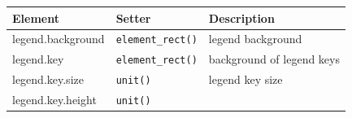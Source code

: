 \begin{longtable}[c]{@{}lll@{}}
\toprule
\begin{minipage}[b]{0.27\columnwidth}\raggedright\strut
Element
\strut\end{minipage} &
\begin{minipage}[b]{0.35\columnwidth}\raggedright\strut
Setter
\strut\end{minipage} &
\begin{minipage}[b]{0.58\columnwidth}\raggedright\strut
Description
\strut\end{minipage}\tabularnewline
\midrule
\endhead
\begin{minipage}[t]{0.27\columnwidth}\raggedright\strut
legend.background
\strut\end{minipage} &
\begin{minipage}[t]{0.35\columnwidth}\raggedright\strut
\texttt{element\_rect()}
\strut\end{minipage} &
\begin{minipage}[t]{0.58\columnwidth}\raggedright\strut
legend background
\strut\end{minipage}\tabularnewline
\begin{minipage}[t]{0.27\columnwidth}\raggedright\strut
legend.key
\strut\end{minipage} &
\begin{minipage}[t]{0.35\columnwidth}\raggedright\strut
\texttt{element\_rect()}
\strut\end{minipage} &
\begin{minipage}[t]{0.58\columnwidth}\raggedright\strut
background of legend keys
\strut\end{minipage}\tabularnewline
\begin{minipage}[t]{0.27\columnwidth}\raggedright\strut
legend.key.size
\strut\end{minipage} &
\begin{minipage}[t]{0.35\columnwidth}\raggedright\strut
\texttt{unit()}
\strut\end{minipage} &
\begin{minipage}[t]{0.58\columnwidth}\raggedright\strut
legend key size
\strut\end{minipage}\tabularnewline
\begin{minipage}[t]{0.27\columnwidth}\raggedright\strut
legend.key.height
\strut\end{minipage} &
\begin{minipage}[t]{0.35\columnwidth}\raggedright\strut
\texttt{unit()}
\strut\end{minipage} &

\end{longtable}
